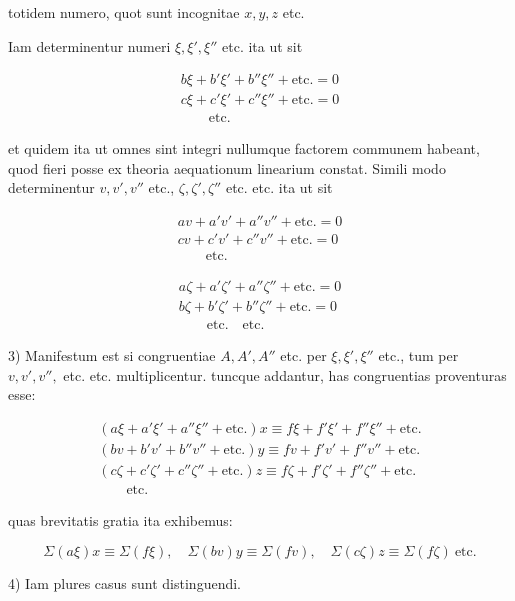  totidem numero, quot sunt incognitae $x,y,z$ etc.

Iam determinentur numeri $\xi,\xi',\xi''$ etc. ita ut sit

\[\begin{array}{l}
b\xi+b'\xi'+b''\xi''+\mathrm{etc.}=0\\
c\xi+c'\xi'+c''\xi''+\mathrm{etc.}=0\\
\qquad\mathrm{etc.}
\end{array}\]

 et quidem ita ut omnes sint integri nullumque factorem communem habeant, quod fieri posse ex theoria aequationum linearium constat. Simili modo determinentur $v,v',v''$ etc., $\zeta,\zeta',\zeta''$ etc. etc. ita ut sit

\[
\begin{array}{l}av+a'v'+a''v''+\mathrm{etc.}=0\\cv+c'v'+c''v''+\mathrm{etc.}=0\\\qquad\mathrm{etc.}\end{array}
\]


\[\begin{array}{l}
a\zeta+a'\zeta'+a''\zeta''+\mathrm{etc.}=0\\
b\zeta+b'\zeta'+b''\zeta''+\mathrm{etc.}=0\\
\qquad\mathrm{etc.}\quad\mathrm{etc.}
\end{array}\]

3) Manifestum est si congruentiae $A,A',A''$ etc. per $\xi,\xi',\xi''$ etc., tum per $v,v',v'',$ etc. etc. multiplicentur. tuncque addantur, has congruentias proventuras esse:

\[
\begin{array}{l}(a\xi+a'\xi'+a''\xi''+\mathrm{etc.})x\equiv f\xi+f'\xi'+f''\xi''+\mathrm{etc.}\\(bv+b'v'+b''v''+\mathrm{etc.})y\equiv fv+f'v'+f''v''+\mathrm{etc.}\\(c\zeta+c'\zeta'+c''\zeta''+\mathrm{etc.})z\equiv f\zeta+f'\zeta'+f''\zeta''+\mathrm{etc.}\\\qquad\mathrm{etc.}\end{array}
\]

 quas brevitatis gratia ita exhibemus:

\[
\Sigma(a\xi)x\equiv\Sigma(f\xi),\quad\Sigma(bv)y\equiv\Sigma(fv),\quad\Sigma(c\zeta)z\equiv\Sigma(f\zeta)\ \mathrm{etc.}
\]

4) Iam plures casus sunt distinguendi.

